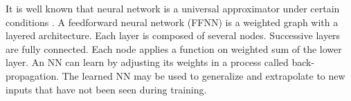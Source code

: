 \documentclass[11pt,a4paper]{article}
\begin{document}
It is well known that  neural network is a universal approximator under certain conditions \cite{hornik1991approximation}.
A feedforward neural network (FFNN) is a weighted graph with a layered architecture.
Each layer is composed of several nodes.
Successive layers are fully connected. Each node applies a function on weighted sum of the lower layer.
An NN can learn by adjusting its weights in a process called back-propagation. 
The learned NN may be used to generalize and extrapolate to new inputs that have not been seen during training.
\end{document}
